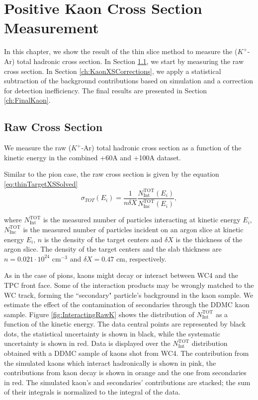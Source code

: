 \chapter{Positive Kaon Cross Section Measurement}\label{ch:KaonXS}

In this chapter, we show the result of the thin slice method to measure  the ($K^+$-Ar) total hadronic cross section. In Section \ref{ch:KaonXSRaw}, we start by measuring the raw cross section. In Section \ref{ch:KaonXSCorrections}, we apply a statistical subtraction of the background contributions based on simulation and a correction for detection inefficiency. The final results are presented in Section \ref{ch:FinalKaon}.


\section{Raw Cross Section}\label{ch:KaonXSRaw}
We measure the raw ($K^+$-Ar) total hadronic cross section as a function of the kinetic energy in the combined +60A and +100A dataset. 

Similar to the pion case,  the raw cross section is given by the equation \ref{eq:thinTargetXSSolved}
\begin{equation}
 \sigma_{TOT} (E_i)  = \frac{1}{n \delta X}\frac{N^{\text{TOT}}_{\text{Int}}(E_i)}{N^{\text{TOT}}_{\text{Inc}}(E_i)},
\end{equation}

where $N^{\text{TOT}}_{\text{Int}}$  is the measured number of particles interacting at kinetic energy $E_i$, $N^{\text{TOT}}_{\text{Inc}}$ is the  measured  number of particles incident  on an argon slice at  kinetic energy $E_i$,  $n$ is the density of the target centers  and $\delta X$ is the thickness of the argon slice. The density of the target centers and the slab thickness are $n = 0.021\cdot10^{24} \text{ cm}^{-3} $ and  $\delta X=0.47\text{ cm}$, respectively.


As in the case of pions, kaons might decay or interact between WC4 and the TPC front face. Some of the interaction products may be wrongly matched to the WC track, forming the ``secondary" particle's background in the kaon sample. We estimate the effect of the contamination of secondaries through  the DDMC kaon sample.
Figure \ref{fig:InteractingRawK} shows the distribution of  $N^{\text{TOT}}_{\text{Int}}$  as a function of the kinetic energy. The data central points are represented by black dots, the statistical uncertainty is shown in black, while the systematic uncertainty is shown in red. Data is displayed over the $N^{\text{TOT}}_{\text{Int}}$  distribution obtained with a DDMC  sample of kaons shot from WC4.  
The contribution from the simulated kaons which interact hadronically is shown in pink, the contributions from kaon decay is shown in orange and the one from secondaries in red. 
The simulated kaon's and secondaries' contributions are stacked; the sum of their integrals is normalized to the integral of the data.
 

